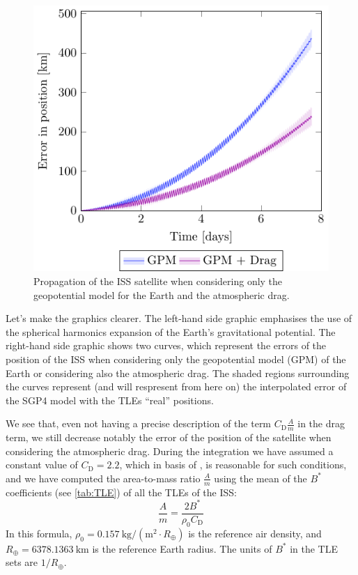 \documentclass[../main.tex]{subfiles}
\begin{document}
\begin{figure}[htbp]
\begin{minipage}[ht]{0.45\textwidth}
    \includegraphics[width=\textwidth]{Images/simulation/ISS.pdf}
    \caption{Propagation of the ISS satellite when considering only the geopotential model for the Earth and the atmospheric drag.}
    \label{fig:ISS}
  \end{minipage}
\end{figure}

Let's make the graphics clearer. The left-hand side graphic emphasises the use of the spherical harmonics expansion of the Earth's gravitational potential. The right-hand side graphic shows two curves, which represent the errors of the position of the ISS when considering only the geopotential model (GPM) of the Earth or considering also the atmospheric drag. The shaded regions surrounding the curves represent (and will respresent from here on) the interpolated error of the SGP4 model with the TLEs ``real'' positions.

We see that, even not having a precise description of the term $C_\mathrm{D}\frac{A}{m}$ in the drag term, we still decrease notably the error of the position of the satellite when considering the atmospheric drag. During the integration we have assumed a constant value of $C_\mathrm{D}=2.2$, which in basis of \cite{montenbruck}, is reasonable for such conditions, and we have computed the area-to-mass ratio $\frac{A}{m}$ using the mean of the $B^*$ coefficients (see \cref{tab:TLE}) of all the TLEs of the ISS:
\begin{equation}
  \frac{A}{m}=\frac{2 B^*}{\rho_0 C_\mathrm{D}}
\end{equation}
In this formula, $\rho_0=0.157\ \mathrm{kg}/(\mathrm{m}^2 \cdot R_\oplus)$ is the reference air density, and $R_\oplus=6378.1363\ \mathrm{km}$ is the reference Earth radius. The units of $B^*$ in the TLE sets are $1 / R_\oplus$.
\end{document}
